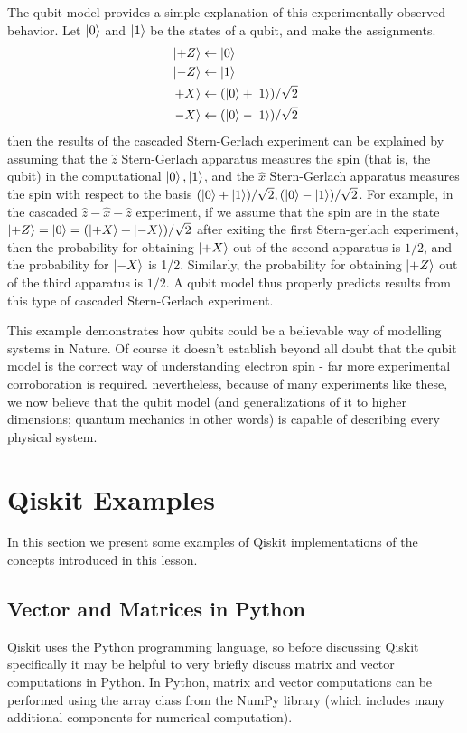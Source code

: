 The qubit model provides a simple explanation of this experimentally observed behavior. Let $\ket{0}$ and $\ket{1}$ be the states of a qubit, and make the assignments.
\begin{align*}
    \ket{+Z} &\leftarrow \ket{0}\\
    \ket{-Z} &\leftarrow \ket{1}\\
    \ket{+X} &\leftarrow (\ket{0}+\ket{1})/\sqrt{2}\\
    \ket{-X} &\leftarrow (\ket{0}- \ket{1})/\sqrt{2}
\end{align*}
then the results of the cascaded Stern-Gerlach experiment can be explained by assuming that the $\hat{z}$ Stern-Gerlach apparatus measures the spin (that is, the qubit) in the computational $\ket{0},\ket{1}$, and the $\hat{x}$ Stern-Gerlach apparatus measures the spin with respect to the basis $(\ket{0}+\ket{1})/\sqrt{2}, (\ket{0}-\ket{1})/\sqrt{2}$. For example, in the cascaded $\hat{z}-\hat{x}-\hat{z}$ experiment, if we assume that the spin are in the state $\ket{+Z}=\ket{0}=(\ket{+X}+\ket{-X})/\sqrt{2}$ after exiting the first Stern-gerlach experiment, then the probability for obtaining $\ket{+X}$ out of the second apparatus is $1/2$, and the probability for $\ket{-X}$ is 1/2. Similarly, the probability for obtaining $\ket{+Z}$ out of the third apparatus is $1/2$. A qubit model thus properly predicts results from this type of cascaded Stern-Gerlach experiment.

This example demonstrates how qubits could be a believable way of modelling systems in Nature. Of course it doesn't establish beyond all doubt that the qubit model is the correct way of understanding electron spin - far more experimental corroboration is required. nevertheless, because of many experiments like these, we now believe that the qubit model (and generalizations of it to higher dimensions; quantum mechanics in other words) is capable of describing every physical system.

\section{Qiskit Examples}
In this section we present some examples of Qiskit implementations of the concepts introduced in this lesson.

\subsection{Vector and Matrices in Python}
Qiskit uses the Python programming language, so before discussing Qiskit specifically it may be helpful to very briefly discuss matrix and vector computations in Python. In Python, matrix and vector computations can be performed using the  array  class from the  NumPy  library (which includes many additional components for numerical computation).

